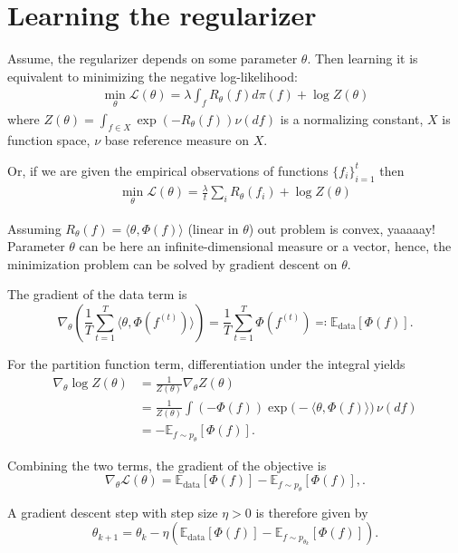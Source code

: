 
\section{Learning the regularizer}

Assume, the regularizer depends on some parameter $\theta$. Then learning it is equivalent to minimizing the negative log-likelihood:
\begin{align*}
	\min_\theta \mathcal{L}(\theta) = \lambda \int_{f} R_\theta(f)d\pi(f) + \log Z(\theta)
\end{align*}
where  $Z(\theta) = \int_{f \in X} \exp(-R_\theta(f)) \nu(df)$ is a normalizing constant, $X$ is function space, $\nu$ base reference measure on $X$.

Or, if we are given the empirical observations of functions $\{ f_i \}_{i=1}^t$ then
\begin{align*}
	\min_\theta \mathcal{L}(\theta) =  \frac{\lambda}{t} \sum_{i} R_\theta(f_i) + \log Z(\theta)
\end{align*}

Assuming $R_\theta(f) = \langle \theta, \Phi(f) \rangle$ (linear in $\theta$) out problem is convex, yaaaaay! Parameter $\theta$ can be here an infinite-dimensional measure or a vector, hence, the minimization problem can be solved by gradient descent on $\theta$.

The gradient of the data term is
\[
	\nabla_\theta
	\left(
	\frac{1}{T}\sum_{t=1}^T \langle \theta,\Phi(f^{(t)})\rangle
	\right)
	=
	\frac{1}{T}\sum_{t=1}^T \Phi(f^{(t)})\eqqcolon \mathbb E_{\mathrm{data}}\!\left[\Phi(f)\right].
\]

For the partition function term, differentiation under the integral yields
\begin{align*}
	\nabla_\theta \log Z(\theta)
	 & =
	\frac{1}{Z(\theta)} \nabla_\theta Z(\theta)             \\
	 & =
	\frac{1}{Z(\theta)}
	\int \left(-\Phi(f)\right)
	\exp\!\big(-\langle \theta,\Phi(f)\rangle\big)\,\nu(df) \\
	 & =
	- \mathbb E_{f \sim p_\theta}\!\left[\Phi(f)\right].
\end{align*}

Combining the two terms, the gradient of the objective is
\[
	\boxed{
		\nabla_\theta \mathcal L(\theta)
		=
		\mathbb E_{\mathrm{data}}\!\left[\Phi(f)\right]
		-
		\mathbb E_{f \sim p_\theta}\!\left[\Phi(f)\right],
	}.
\]



A gradient descent step with step size $\eta>0$ is therefore given by
\[
	\boxed{
		\theta_{k+1}
		=
		\theta_k
		-
		\eta
		\left(
		\mathbb E_{\mathrm{data}}\!\left[\Phi(f)\right]
		-
		\mathbb E_{f \sim p_{\theta_k}}\!\left[\Phi(f)\right]
		\right).
	}
\]

